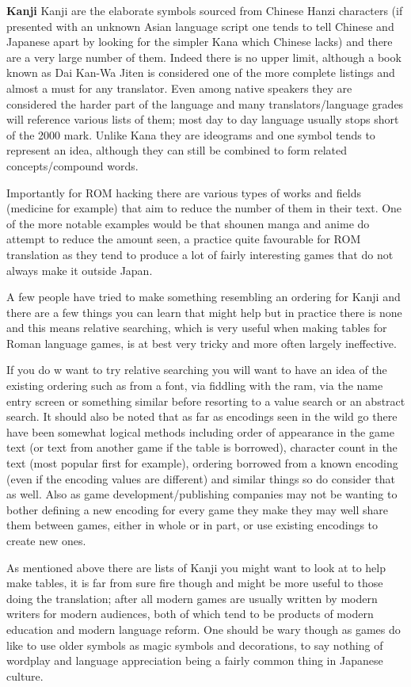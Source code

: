 \documentclass[
]{book}
\begin{document}
\textbf{Kanji} Kanji are the elaborate symbols sourced from Chinese Hanzi characters (if presented with an unknown Asian language script one tends to tell Chinese and Japanese apart by looking for the simpler Kana which Chinese lacks) and there are a very large number of them. Indeed there is no upper limit, although a book known as Dai Kan-Wa Jiten is considered one of the more complete listings and almost a must for any translator. Even among native speakers they are considered the harder part of the language and many translators/language grades will reference various lists of them; most day to day language usually stops short of the 2000 mark. Unlike Kana they are ideograms and one symbol tends to represent an idea, although they can still be combined to form related concepts/compound words.

Importantly for ROM hacking there are various types of works and fields (medicine for example) that aim to reduce the number of them in their text. One of the more notable examples would be that shounen manga and anime do attempt to reduce the amount seen, a practice quite favourable for ROM translation as they tend to produce a lot of fairly interesting games that do not always make it outside Japan.

A few people have tried to make something resembling an ordering for Kanji and there are a few things you can learn that might help but in practice there is none and this means relative searching, which is very useful when making tables for Roman language games, is at best very tricky and more often largely ineffective.

If you do w want to try relative searching you will want to have an idea of the existing ordering such as from a font, via fiddling with the ram, via the name entry screen or something similar before resorting to a value search or an abstract search. It should also be noted that as far as encodings seen in the wild go there have been somewhat logical methods including order of appearance in the game text (or text from another game if the table is borrowed), character count in the text (most popular first for example), ordering borrowed from a known encoding (even if the encoding values are different) and similar things so do consider that as well. Also as game development/publishing companies may not be wanting to bother defining a new encoding for every game they make they may well share them between games, either in whole or in part, or use existing encodings to create new ones.

As mentioned above there are lists of Kanji you might want to look at to help make tables, it is far from sure fire though and might be more useful to those doing the translation; after all modern games are usually written by modern writers for modern audiences, both of which tend to be products of modern education and modern language reform. One should be wary though as games do like to use older symbols as magic symbols and decorations, to say nothing of wordplay and language appreciation being a fairly common thing in Japanese culture.
\end{document}
